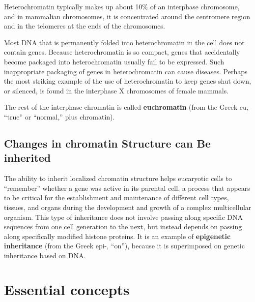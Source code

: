 Heterochromatin typically makes up about 10\% of an interphase chromosome, and in mammalian
chromosomes, it is concentrated around the centromere region
and in the telomeres at the ends of the chromosomes.

Most DNA that is permanently folded into heterochromatin in the cell
does not contain genes. Because heterochromatin is so compact, genes
that accidentally become packaged into heterochromatin usually fail to
be expressed. Such inappropriate packaging of genes in
heterochromatin can cause diseases.
Perhaps the most striking example of the use of heterochromatin to keep
genes shut down, or silenced, is found in the interphase X chromosomes of
female mammals.

The rest of the interphase chromatin is called \textbf{euchromatin} (from the
Greek eu, “true” or “normal,” plus chromatin).

\subsection{Changes in chromatin Structure can Be inherited}

The ability to inherit localized chromatin structure helps eucaryotic cells
to “remember” whether a gene was active in its parental cell, a process
that appears to be critical for the establishment and maintenance of different
cell types, tissues, and organs during the development and growth
of a complex multicellular organism. This type of inheritance does not
involve passing along specific DNA sequences from one cell generation to
the next, but instead depends on passing along specifically modified histone
proteins. It is an example of \textbf{epigenetic inheritance} (from the Greek
epi-, “on”), because it is superimposed on genetic inheritance based on
DNA.

\section{Essential concepts}

